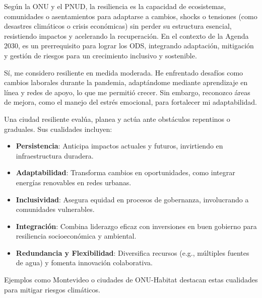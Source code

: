 Según la ONU y el PNUD, la resiliencia es la capacidad de ecosistemas, comunidades o asentamientos para adaptarse a cambios, shocks o tensiones (como desastres climáticos o crisis económicas) sin perder su estructura esencial, resistiendo impactos y acelerando la recuperación. En el contexto de la Agenda 2030, es un prerrequisito para lograr los ODS, integrando adaptación, mitigación y gestión de riesgos para un crecimiento inclusivo y sostenible.

Sí, me considero resiliente en medida moderada. He enfrentado desafíos como cambios laborales durante la pandemia, adaptándome mediante aprendizaje en línea y redes de apoyo, lo que me permitió crecer. Sin embargo, reconozco áreas de mejora, como el manejo del estrés emocional, para fortalecer mi adaptabilidad.

Una ciudad resiliente evalúa, planea y actúa ante obstáculos repentinos o graduales. Sus cualidades incluyen:
\begin{itemize}
\item \textbf{Persistencia}: Anticipa impactos actuales y futuros, invirtiendo en infraestructura duradera.
\item \textbf{Adaptabilidad}: Transforma cambios en oportunidades, como integrar energías renovables en redes urbanas.
\item \textbf{Inclusividad}: Asegura equidad en procesos de gobernanza, involucrando a comunidades vulnerables.
\item \textbf{Integración}: Combina liderazgo eficaz con inversiones en buen gobierno para resiliencia socioeconómica y ambiental.
\item \textbf{Redundancia y Flexibilidad}: Diversifica recursos (e.g., múltiples fuentes de agua) y fomenta innovación colaborativa. 
\end{itemize}
Ejemplos como Montevideo o ciudades de ONU-Habitat destacan estas cualidades para mitigar riesgos climáticos.





